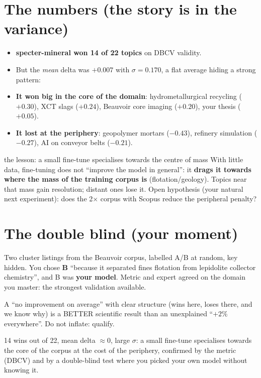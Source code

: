 \documentclass[11pt,a4paper]{article}
\begin{document}
\section{The numbers (the story is in the variance)}

\begin{itemize}
  \item \textbf{specter-mineral won 14 of 22 topics} on DBCV validity.
  \item But the \emph{mean} delta was $+0.007$ with $\sigma = 0.170$, a flat average hiding a
        strong pattern:
  \item \textbf{It won big in the core of the domain}: hydrometallurgical recycling ($+0.30$),
        XCT slags ($+0.24$), Beauvoir core imaging ($+0.20$), your thesis ($+0.05$).
  \item \textbf{It lost at the periphery}: geopolymer mortars ($-0.43$), refinery simulation
        ($-0.27$), AI on conveyor belts ($-0.21$).
\end{itemize}

\begin{concepto}{the lesson: a small fine-tune specialises towards the centre of mass}
With little data, fine-tuning does not ``improve the model in general'': it \textbf{drags it
towards where the mass of the training corpus is} (flotation/geology). Topics near that mass
gain resolution; distant ones lose it. Open hypothesis (your natural next experiment): does the
2$\times$ corpus with Scopus reduce the peripheral penalty?
\end{concepto}

\section{The double blind (your moment)}

Two cluster listings from the Beauvoir corpus, labelled A/B at random, key hidden. You chose
\textbf{B} ``because it separated fines flotation from lepidolite collector chemistry'', and B
was \textbf{your model}. Metric and expert agreed on the domain you master: the strongest
validation available.

\begin{ojo}
A ``no improvement on average'' with clear structure (wins here, loses there, and we know why)
is a BETTER scientific result than an unexplained ``$+2\%$ everywhere''. Do not inflate:
qualify.
\end{ojo}

\begin{resumen}
14 wins out of 22, mean delta $\approx 0$, large $\sigma$: a small fine-tune specialises
towards the core of the corpus at the cost of the periphery, confirmed by the metric (DBCV) and
by a double-blind test where you picked your own model without knowing it.
\end{resumen}
\clearpage
{}
{}
\end{document}
